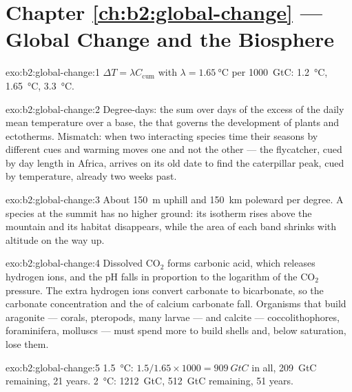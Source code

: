 \section*{Chapter \ref{ch:b2:global-change} --- Global Change and the Biosphere}

\begin{solution}{exo:b2:global-change:1}
$\Delta T = \lambda C_{\text{cum}}$ with $\lambda = \qty{1.65}{\celsius}$
per \qty{1000}{GtC}: \qty{1.2}{\celsius}, \qty{1.65}{\celsius},
\qty{3.3}{\celsius}.
\end{solution}

\begin{solution}{exo:b2:global-change:2}
Degree-days: the sum over days of the excess of the daily mean
temperature over a base, the  that governs the
development of plants and ectotherms. Mismatch: when two
interacting species time their seasons by different cues and
warming moves one and not the other --- the flycatcher, cued by
day length in Africa, arrives on its old date to find the
caterpillar peak, cued by temperature, already two weeks past.
\end{solution}

\begin{solution}{exo:b2:global-change:3}
About \qty{150}{m} uphill and \qty{150}{km} poleward per degree. A
species at the summit has no higher ground: its isotherm rises
above the mountain and its habitat disappears, while the area of
each band shrinks with altitude on the way up.
\end{solution}

\begin{solution}{exo:b2:global-change:4}
Dissolved \ensuremath{\mathrm{CO_2}} forms carbonic acid, which
releases hydrogen ions, and the pH falls in proportion to the
logarithm of the \ensuremath{\mathrm{CO_2}} pressure. The extra
hydrogen ions convert carbonate to bicarbonate, so the carbonate
concentration and the  of calcium carbonate fall.
Organisms that build aragonite --- corals, pteropods, many larvae
--- and calcite --- coccolithophores, foraminifera, molluscs ---
must spend more to build shells and, below saturation, lose them.
\end{solution}

\begin{solution}{exo:b2:global-change:5}
\qty{1.5}{\celsius}: $1.5/1.65\times 1000 = \qty{909}{GtC}$ in all,
\qty{209}{GtC} remaining, 21 years. \qty{2}{\celsius}:
\qty{1212}{GtC}, \qty{512}{GtC} remaining, 51 years.
\end{solution}

